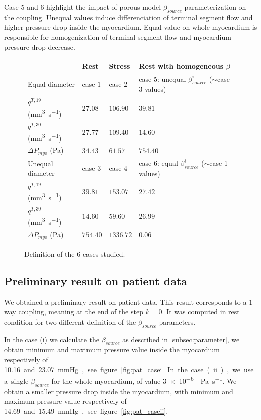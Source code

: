 \documentclass[a4paper, 11pt]{article} %
\begin{document}
Case $5$ and $6$ highlight the impact of porous model $\beta_{source}$ parameterization on the coupling. Unequal values induce differenciation of terminal segment flow and higher pressure drop inside the myocardium. Equal value on whole myocardium is responsible for homogenization of terminal segment flow and myocardium pressure drop decrease.
\begin{figure}[hbtp]
\begin{adjustwidth}{-2.8cm}{}
\begin{center}
\begin{tabular}{|p{3.5cm}|p{3cm}|p{3cm}|p{4.5cm}|}
\hline
 & Rest & Stress & Rest with homogeneous $\beta$\\
 \hline
 Equal diameter & case $1$ & case $2$ & case 5: unequal $\beta_{source}^i$ ($\sim$case $3$ values)\\
\hdashline
$q^{T,19}$ (\si{\cubic\milli\meter\per\second})	& $27.08$ &   $106.90$ & $39.81$ \\
$q^{T,30}$ (\si{\cubic\milli\meter\per\second})	& $27.77 $ &  $109.40$ & $14.60$ \\
$\Delta P_{myo}$ (\si{\Pa})				& $34.43$ & $61.57$ & $754.40$ \\
 \hline
 Unequal diameter & case $3$ & case $4$ & case 6: equal $\beta_{source}^i$ ($\sim$case 1 values)\\
 \hdashline
 $q^{T,19}$ (\si{\cubic\milli\meter\per\second})	& $39.81$ &   $153.07$ & $27.42$ \\
$q^{T,30}$ (\si{\cubic\milli\meter\per\second})	& $14.60$ &  $59.60$ & $26.99$ \\
$\Delta P_{myo}$ (\si{\Pa})				& $754.40$ & $1336.72$ & $0.06$ \\
 \hline
\end{tabular}
\caption{Definition of the $6$ cases studied.}
\label{tab:rescase}
\end{center}
\end{adjustwidth}
\end{figure}

\subsection{Preliminary result on patient data}
We obtained a preliminary result on patient data. This result corresponds to a $1$ way coupling, meaning at the end of the step $k=0$. It was computed in rest condition for two different definition of the $\beta_{source}$ parameters.

In the case (i) we calculate the $\beta_{source}$ as described in \ref{subsec:parameter}, we obtain minimum and maximum pressure value inside the myocardium respectively of \SI{10.16} and \SI{23.07}{\mmHg}, see figure \ref{fig:pat_casei}.
In the case (ii), we use a single $\beta_{source}$ for the whole myocardium, of value \SI{3e-6}{\per\Pa\per\second}. We obtain a smaller pressure drop inside the myocardium, with minimum and maximum pressure value respectively of \SI{14.69} and \SI{15.49}{\mmHg}, see figure \ref{fig:pat_caseii}.
\end{document}
